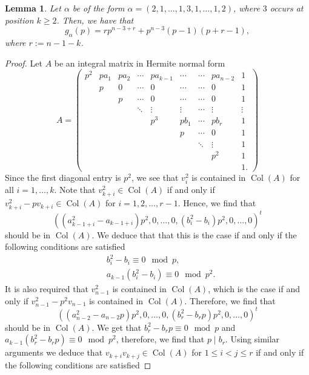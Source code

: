 \documentclass[a4paper]{amsart}
\newtheorem{lemma}[theorem]{Lemma}
\numberwithin{equation}{section}
\theoremstyle{remark}
\newcommand{\op}[1]{\operatorname{#1}}
\begin{document}
 \begin{lemma}\label{lemma 4}
 Let $\alpha$ be of the form $\alpha=(2,1,\dots, 1, 3, 1,\dots, 1, 2)$, where $3$ occurs at position $k\geq 2$. Then, we have that
 \[g_{\alpha}(p) = rp^{n-3+r} + p^{n-3}(p-1)(p+r-1),\]
 where $r:=n-1-k$.
 \end{lemma}
 \begin{proof}
   Let $A$ be an integral matrix in Hermite normal form \[A=\begin{pmatrix}
	 p^{2}& p a_1 & pa_2 & \cdots & pa_{k-1}& \cdots & \cdots & p a_{n-2} & 1 \\
	& p & 0 & \cdots & 0 &  \cdots & \cdots & 0 & 1\\
	&& p & \cdots & 0 & \cdots &  \cdots & 0  & 1\\
	&&& \ddots & \vdots& \vdots & \cdots & \vdots & \vdots\\
	&&&& p^{3} & p b_1 & \cdots & p b_r & 1\\
    &&&&  & p & \cdots & 0 & 1\\
    	&&&&& & \ddots & \vdots & 1\\
	&&&&&&& p^{2} & 1\\
	&&&&&&&&1.
	\end{pmatrix}\]
	Since the first diagonal entry is $p^2$, we see that $v_i^2$ is contained in $\op{Col}(A)$ for all $i=1,\dots,k$. Note that $v_{k+i}^2 \in \op{Col}(A)$ if and only if $v_{k+i}^2-pv_{k+i} \in \op{Col}(A)$ for $i = 1,2,\dots,r-1$. Hence, we find that
	\[\left((a_{k-1+i}^2-a_{k-1+i})p^2,0,\dots,0,(b_i^2-b_i)p^2,0,\dots,0\right)^t\]
	should be in $\op{Col}(A)$. We deduce that that this is the case if and only if the following conditions are satisfied
	\begin{equation}
	\begin{split}
	   & b_i^2-b_i \equiv 0 \mod p,\\
	   &  a_{k-1}(b_i^2-b_i) \equiv 0 \mod p^2.
	 \end{split}
	\end{equation}
	It is also required that $v_{n-1}^2$ is contained in $\op{Col}(A)$, which is the case if and only if $v_{n-1}^2 - p^2v_{n-1}$ is contained in $ \op{Col}(A)$. Therefore, we find that
	\[\left((a_{n-2}^2-a_{n-2}p)p^2,0,\dots,0,(b_r^2-b_r p)p^2,0,\dots,0\right)^t\]
	should be in $\op{Col}(A)$. We get that $b_r^2 - b_r p \equiv 0 \mod p$ and $a_{k-1}(b_r^2-b_r p) \equiv 0 \mod p^2$, therefore, we find that $p \mid b_r$. Using similar arguments we deduce that $v_{k+i}v_{k+j} \in \op{Col}(A)$ for $1 \leq i < j \leq r$ if and only if the following conditions are satisfied

\end{proof}
\end{document}
